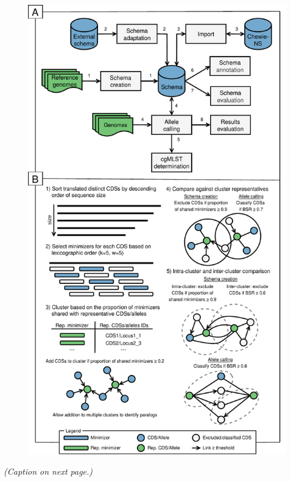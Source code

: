 \begin{figure}[h!]
    \centering
    \includegraphics[angle=0,height=0.92\textheight]{figures/chapter 2/Figure1.pdf}
    \label{fig:chap2_figure1}
\end{figure}
\vspace*{-6mm}
\begin{center}
    \emph{(Caption on next page.)}
\end{center}
